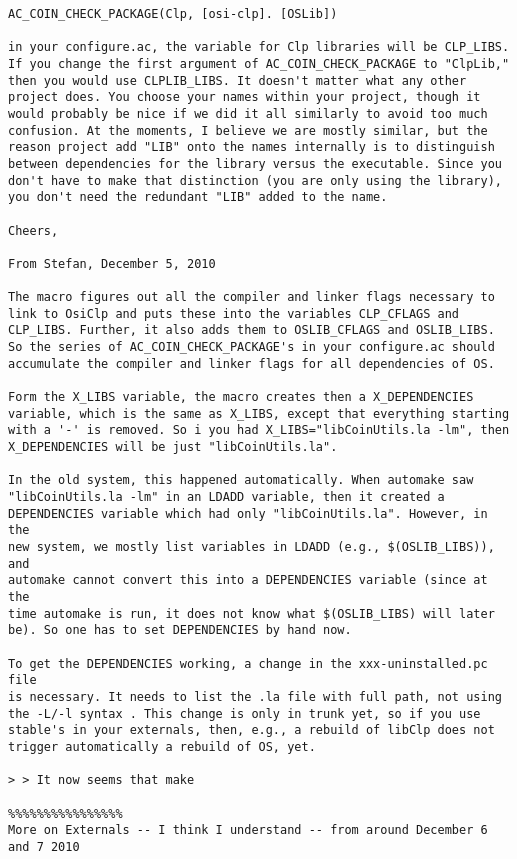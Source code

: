 \begin{verbatim}
AC_COIN_CHECK_PACKAGE(Clp, [osi-clp]. [OSLib])

in your configure.ac, the variable for Clp libraries will be CLP_LIBS.
If you change the first argument of AC_COIN_CHECK_PACKAGE to "ClpLib,"
then you would use CLPLIB_LIBS. It doesn't matter what any other
project does. You choose your names within your project, though it
would probably be nice if we did it all similarly to avoid too much
confusion. At the moments, I believe we are mostly similar, but the
reason project add "LIB" onto the names internally is to distinguish
between dependencies for the library versus the executable. Since you
don't have to make that distinction (you are only using the library),
you don't need the redundant "LIB" added to the name.

Cheers,

From Stefan, December 5, 2010

The macro figures out all the compiler and linker flags necessary to
link to OsiClp and puts these into the variables CLP_CFLAGS and
CLP_LIBS. Further, it also adds them to OSLIB_CFLAGS and OSLIB_LIBS.
So the series of AC_COIN_CHECK_PACKAGE's in your configure.ac should
accumulate the compiler and linker flags for all dependencies of OS.

Form the X_LIBS variable, the macro creates then a X_DEPENDENCIES
variable, which is the same as X_LIBS, except that everything starting
with a '-' is removed. So i you had X_LIBS="libCoinUtils.la -lm", then
X_DEPENDENCIES will be just "libCoinUtils.la".

In the old system, this happened automatically. When automake saw
"libCoinUtils.la -lm" in an LDADD variable, then it created a
DEPENDENCIES variable which had only "libCoinUtils.la". However, in the
new system, we mostly list variables in LDADD (e.g., $(OSLIB_LIBS)), and
automake cannot convert this into a DEPENDENCIES variable (since at the
time automake is run, it does not know what $(OSLIB_LIBS) will later
be). So one has to set DEPENDENCIES by hand now.

To get the DEPENDENCIES working, a change in the xxx-uninstalled.pc file
is necessary. It needs to list the .la file with full path, not using
the -L/-l syntax . This change is only in trunk yet, so if you use
stable's in your externals, then, e.g., a rebuild of libClp does not
trigger automatically a rebuild of OS, yet.

> > It now seems that make 

%%%%%%%%%%%%%%%%
More on Externals -- I think I understand -- from around December 6 and 7 2010


\end{verbatim}
